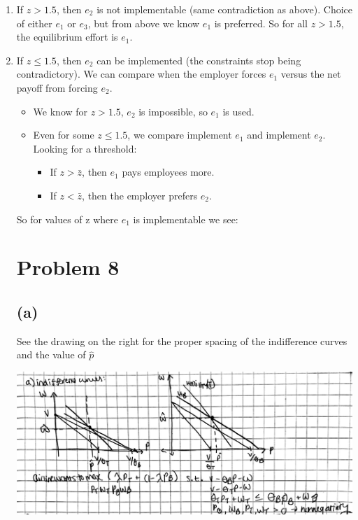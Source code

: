 \documentclass{article}
\begin{document}
\begin{enumerate}
    \item If \( z > 1.5 \), then \( e_{2} \) is not implementable (same contradiction as above). Choice of either \( e_{1} \) or \( e_{3} \), but from above we know $e_1$ is preferred. So for all \( z > 1.5 \), the equilibrium effort is \( e_{1} \).

    \item If \( z \le 1.5 \), then \( e_{2} \) can be implemented (the constraints stop being contradictory). We can compare when the employer forces \( e_{1} \) versus the net payoff from forcing \( e_{2} \).

\begin{itemize}
    \item We know for \( z > 1.5 \), \( e_{2} \) is impossible, so \( e_{1} \) is used.
    
    \item Even for some \( z \le 1.5 \), we compare implement \( e_{1} \) and implement \( e_{2} \). Looking for a threshold: 
    \begin{itemize}
        \item If \( z > \bar{z} \), then \( e_{1} \) pays employees more.
        \item If \( z < \bar{z} \), then the employer prefers \( e_{2} \).
    \end{itemize}
\end{itemize}

So for values of z where $e_1$ is implementable we see: 


\section{Problem 8}

\subsection*{(a)}
See the drawing on the right for the proper spacing of the indifference curves and the value of $\hat{p}$
\begin{center}
    \includegraphics[width = .75\linewidth]{images/Screenshot 2025-03-22 at 20.53.04.png}
\end{center}


\end{enumerate}
\end{document}
